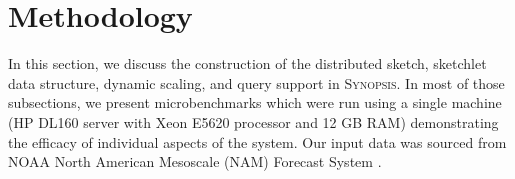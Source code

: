 \section{Methodology}
\label{sec:methodology}
In this section, we discuss the construction of the distributed sketch, sketchlet data structure, dynamic scaling, and query support in \textsc{Synopsis}. In most of those subsections, we present microbenchmarks which were run using a single machine (HP DL160 server with Xeon E5620 processor and 12 GB RAM) demonstrating the efficacy of individual aspects of the system. Our input data was sourced from NOAA North American Mesoscale (NAM) Forecast System \cite{noaa_nam}.







%

